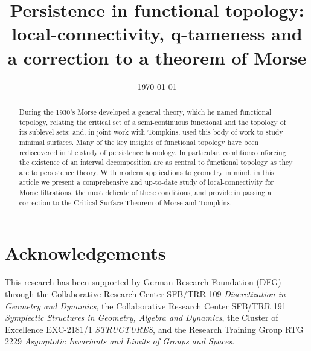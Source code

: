 \documentclass{amsart}
\theoremstyle{plain}
\theoremstyle{definition}
\begin{document}
\title[Persistence in functional topology]{Persistence in functional topology: local-connectivity, q-tameness and a correction to a theorem of Morse}
\author{}
\date{\today}

\begin{abstract}
	During the 1930's Morse developed a general theory, which he named functional topology, relating the critical set of a semi-continuous functional and the topology of its sublevel sets; and, in joint work with Tompkins, used this body of work to study minimal surfaces.
	Many of the key insights of functional topology have been rediscovered in the study of persistence homology.
	In particular, conditions enforcing the existence of an interval decomposition are as central to functional topology as they are to persistence theory.
	With modern applications to geometry in mind, in this article we present a comprehensive and up-to-date study of local-connectivity for Morse filtrations, the most delicate of these conditions, and provide in passing a correction to the Critical Surface Theorem of Morse and Tompkins.
\end{abstract}


\maketitle
\tableofcontents




%

%

\section*{Acknowledgements}
This research has been supported by German Research Foundation (DFG) through the Collaborative Research Center SFB/TRR 109 \emph{Discretization in Geometry and Dynamics}, the Collaborative Research Center SFB/TRR 191 \emph{Symplectic Structures in Geometry, Algebra and Dynamics}, the Cluster of Excellence EXC-2181/1 \emph{STRUCTURES}, and the Research Training Group RTG 2229 \emph{Asymptotic Invariants and Limits of Groups and Spaces}.




\todos
\end{document}
